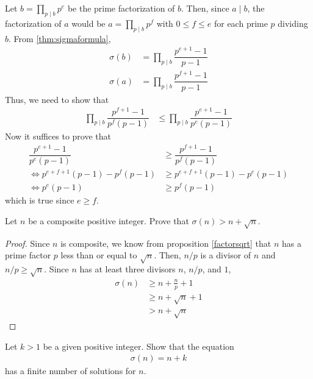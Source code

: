 \begin{solution}
	Let $b=\prod\limits_{p\mid b}p^e$ be the prime factorization of $b$. Then, since $a\mid b$, the factorization of $a$ would be $a=\prod\limits_{p\mid b}p^f$ with $0\leq f\leq e$ for each prime $p$ dividing $b$. From \autoref{thm:sigmaformula},
		\begin{align*}
			\sigma(b)
				& =\prod_{p\mid b}\dfrac{p^{e+1}-1}{p-1}\\
			\sigma(a)
				& =\prod_{p\mid b}\dfrac{p^{f+1}-1}{p-1}
		\end{align*}
	Thus, we need to show that
		\begin{align*}
			\prod_{p\mid b}\dfrac{p^{f+1}-1}{p^f(p-1)}
				& \leq\prod_{p\mid b}\dfrac{p^{e+1}-1}{p^e(p-1)}
		\end{align*}
	Now it suffices to prove that
	\begin{align*}
		\dfrac{p^{e+1}-1}{p^e(p-1)}
			& \geq\dfrac{p^{f+1}-1}{p^f(p-1)}\\
		\iff p^{e+f+1}(p-1)-p^f(p-1)
			&\geq p^{e+f+1}(p-1)-p^e(p-1)\\
		\iff p^e(p-1)
			&\geq p^f(p-1)
	\end{align*}
	which is true since $e \geq f$.

\end{solution}

\begin{proposition}\label{prop:sigma(n)>n+sqrt(n)}
	Let $n$ be a composite positive integer. Prove that $\sigma(n) > n + \sqrt n$.
\end{proposition}

\begin{proof}
	Since $n$ is composite, we know from proposition \ref{factorsqrt} that $n$ has a prime factor $p$ less than or equal to $\sqrt n$. Then, $n/p$ is a divisor of $n$ and $n/p \geq \sqrt n$. Since $n$ has at least three divisors $n$, $n/p$, and $1$,
		\begin{align*}
			\sigma(n) &\geq n + \frac{n}{p} + 1\\
			  &\geq n + \sqrt n + 1\\
			  &> n+ \sqrt n
		\end{align*}
\end{proof}

\begin{theorem}
	Let $k>1$ be a given positive integer. Show that the equation
		\begin{align*}
			\sigma(n) = n + k
		\end{align*}
	has a finite number of solutions for $n$.
\end{theorem}

